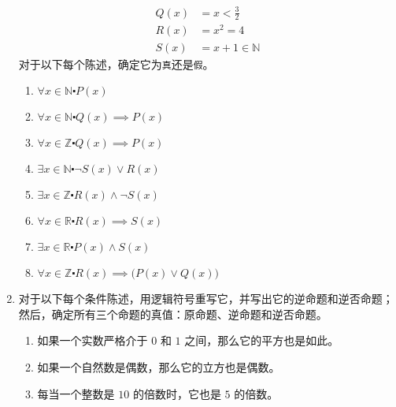 \begin{enumerate}[label=(\arabic*)]
\begin{align*}
            Q(x) &= x < \frac{3}{2} \\
            R(x) &= x^2 = 4 \\
            S(x) &= x + 1 \in \mathbb{N} 
        \end{align*}
        对于以下每个陈述，确定它为\verb|真|还是\verb|假|。
        \begin{enumerate}[label=(\alph*)]
            \item $\forall x \in \mathbb{N} \centerdot P(x)$
            \item $\forall x \in \mathbb{N} \centerdot Q(x) \implies P(x)$
            \item $\forall x \in \mathbb{Z} \centerdot Q(x) \implies P(x)$
            \item $\exists x \in \mathbb{N} \centerdot \neg S(x) \lor R(x)$
            \item $\exists x \in \mathbb{Z} \centerdot R(x) \land \neg S(x)$
            \item $\forall x \in \mathbb{R} \centerdot R(x) \implies S(x)$
            \item $\exists x \in \mathbb{R} \centerdot P(x) \land S(x)$
            \item $\forall x \in \mathbb{Z} \centerdot R(x) \implies \big(P(x) \lor Q(x)\big)$
        \end{enumerate}
    \item 对于以下每个条件陈述，用逻辑符号重写它，并写出它的逆命题和逆否命题；然后，确定所有三个命题的真值：原命题、逆命题和逆否命题。
        \begin{enumerate}[label=(\alph*)]
            \item 如果一个实数严格介于 $0$ 和 $1$ 之间，那么它的平方也是如此。
            \item 如果一个自然数是偶数，那么它的立方也是偶数。
            \item 每当一个整数是 $10$ 的倍数时，它也是 $5$ 的倍数。
        \end{enumerate}
\end{enumerate}